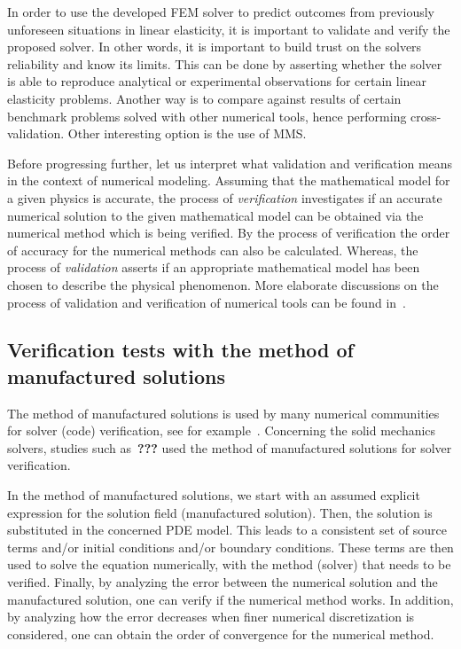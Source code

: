 \documentclass{report}
\begin{document}
In order to use the developed FEM solver to predict outcomes from previously unforeseen situations in linear elasticity, it is important to validate and verify the proposed solver. In other words, it is important to build trust on the solvers reliability and know its limits. This can be done by asserting whether the solver is able to reproduce analytical or experimental observations for certain linear elasticity problems. Another way is to compare against results of certain benchmark problems solved with other numerical tools, hence performing cross-validation. Other interesting option is the use of MMS. 

Before progressing further, let us  interpret  what validation and verification means in the context of numerical modeling. Assuming that the mathematical model for a given physics is accurate, the process of \textit{verification}  investigates if an accurate numerical solution to the given mathematical model can be obtained via the numerical method which is being verified. By the process of verification the order of accuracy for the numerical methods can also be calculated. Whereas, the process of \textit{validation} asserts if an appropriate mathematical model has been chosen to describe the physical phenomenon. More elaborate discussions on the process of validation and verification of numerical tools can be found in~\cite{oberkampf2004verification}. 

	 
\subsection{Verification tests with the method of manufactured solutions }
The method of manufactured solutions is used by many numerical communities for solver (code) verification, see for example~\cite{roache1998verification,ecca2007verification,pautz2001verification}. Concerning the solid mechanics solvers, studies such as~\textbf{???} used the method of manufactured solutions for solver verification.

In the method of manufactured solutions, we start with an assumed explicit expression for the solution field (manufactured solution). Then, the solution is substituted  in the  concerned PDE model. This leads to a consistent set of source terms and/or initial conditions and/or boundary conditions. These terms are then used to solve the equation numerically, with the method (solver) that needs to be verified. Finally, by analyzing the error between the numerical solution and the manufactured solution, one can verify if the numerical method works. In addition, by analyzing how the error decreases when finer numerical discretization is considered, one can obtain the order of convergence for the numerical method. 
\end{document}
